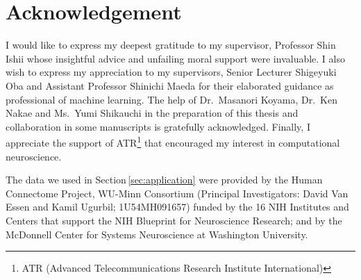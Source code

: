 \section{Acknowledgement}
%
I would like to express my deepest gratitude to my supervisor, Professor Shin Ishii whose
insightful advice and unfailing moral support were invaluable.
I also wish to express my appreciation to my supervisors,
Senior Lecturer Shigeyuki Oba and Assistant Professor Shinichi Maeda
for their elaborated guidance as professional of machine learning.
The help of Dr.\ Masanori Koyama, Dr.\ Ken Nakae and Ms.\ Yumi Shikauchi
in the preparation of this thesis and collaboration in some manuscripts \cite{Koyamada2014a,Koyamada2014b,Koyamada2015}
is gratefully acknowledged.
Finally, I appreciate the support of ATR\footnote{ATR (Advanced
Telecommunications Research Institute International)} that encouraged my interest in
computational neuroscience.

The data we used in Section\,\ref{sec:application} were provided by the Human Connectome Project,
WU-Minn Consortium
(Principal Investigators: David Van Essen and Kamil Ugurbil;
1U54MH091657) funded by the 16 NIH Institutes and Centers that support
the NIH Blueprint for Neuroscience Research; and by the McDonnell Center
for Systems Neuroscience at Washington University.
